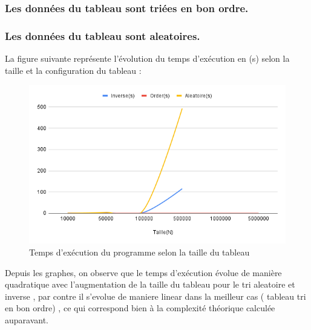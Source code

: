 \subsubsection{Les données du tableau sont triées en bon ordre.}
\small
\begin{center}
\end{center}
\normalsize
\par
\subsubsection{Les données du tableau sont aleatoires.}
\small
\begin{center}
\end{center}
\normalsize
\par
La figure suivante représente l’évolution du temps d’exécution en (s) selon la taille et la configuration du tableau :
\begin{figure}[H]
    \centering
        \includegraphics[scale=0.7]{ressources/bulleexp.png}
        \caption{Temps d'exécution du programme selon la taille du tableau}
    \label{fig:temps_exec_dico_theo}
\end{figure} 
\par
Depuis les graphes, on observe que le temps d’exécution évolue de manière quadratique avec l’augmentation de la taille du tableau pour le tri aleatoire et inverse , par contre il s'evolue de maniere linear dans la meilleur cas ( tableau tri en bon ordre) , ce qui correspond bien à la complexité théorique calculée auparavant.
